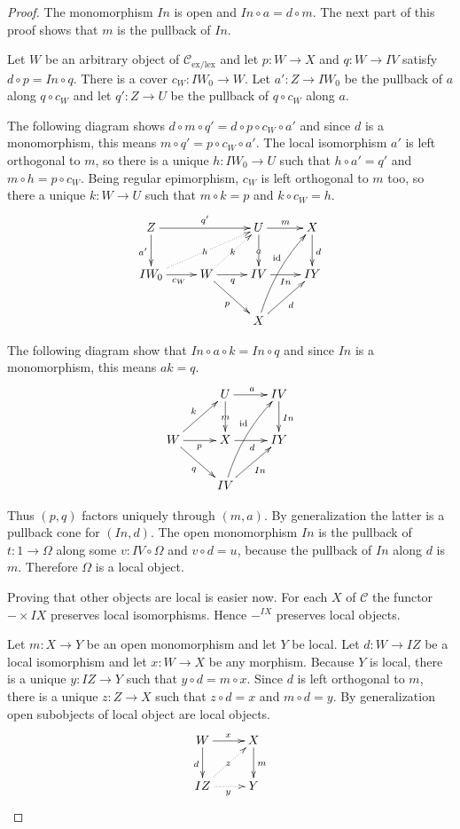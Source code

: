 \documentclass[sort&compress]{elsarticle}
\theoremstyle{plain}
\theoremstyle{definition}
\theoremstyle{remark}
\newcommand\cat\mathcal
\newcommand\exlex{_\mathrm{ex/lex}}\newcommand\exreg{_\mathrm{ex/reg}}
\begin{document}
\begin{proof}
The monomorphism $In$ is open and $In \circ a = d\circ m$. The next part of this proof shows that $m$ is the pullback of $In$.

Let $W$ be an arbitrary object of $\cat C\exlex$ and let $p: W\to X$ and $q:W\to IV$ satisfy $d\circ p = In\circ q$. There is a cover $c_W:IW_0 \to W$. Let $a':Z\to IW_0$ be the pullback of $a$ along $q\circ c_W$ and let $q':Z\to U$ be the pullback of $q\circ c_W$ along $a$.

The following diagram shows $d\circ m \circ q' = d\circ p \circ c_W \circ a'$ and since $d$ is a monomorphism, this means $m\circ q' = p \circ c_W \circ a'$. The local isomorphism $a'$ is left orthogonal to $m$, so there is a unique $h:IW_0 \to U$ such that $h\circ a'= q'$ and $m\circ h = p\circ c_W$. Being regular epimorphism, $c_W$ is left orthogonal to $m$ too, so there a unique $k: W\to U$ such that $m\circ k = p$ and $k\circ c_W = h$.
\[ \xymatrix{
Z \ar[rr]^{q'} \ar[d]_{a'} && U \ar[r]^m \ar[d]|a & X\ar[d]^d \\
IW_0 \ar[r]_{c_W}\ar@{.>}[urr]|h & W \ar[r]_q \ar[dr]_{p}\ar@{.>}[ur]|k & IV\ar[r]_{In} & IY \\ 
& & X \ar[ur]_d \ar@/^/[uur]^(.6)\id
}\]

The following diagram show that $In\circ a\circ k = In\circ q$ and since $In$ is a monomorphism, this means $a k = q$.
\[ \xymatrix{
& U \ar[d]|m \ar[r]^a & IV \ar[d]^{In} \\  
W \ar[ur]^k \ar[r]_p \ar[dr]_q & X\ar[r]_d & IY \\
& IV \ar[ur]_{In} \ar@/^/[uur]^(.6)\id
}\]

Thus $(p,q)$ factors uniquely through $(m,a)$. By generalization the latter is a pullback cone for $(In, d)$. The open monomorphism $In$ is the pullback of $t:1\to \Omega$ along some $v:IV\circ \Omega$ and $v\circ d = u$, because the pullback of $In$ along $d$ is $m$. Therefore $\Omega$ is a local object.

Proving that other objects are local is easier now. For each $X$ of $\cat C$ the functor $-\times IX$ preserves local isomorphisms. Hence $-^{IX}$ preserves local objects.

Let $m:X\to Y$ be an open monomorphism and let $Y$ be local. Let $d: W\to IZ$ be a local isomorphism and let $x:W\to X$ be any morphism. Because $Y$ is local, there is a unique $y: IZ\to Y$ such that $y\circ d = m\circ x$. Since $d$ is left orthogonal to $m$, there is a unique $z:Z\to X$ such that $z\circ d = x$ and $m\circ d = y$. By generalization open subobjects of local object are local objects.
\[ \xymatrix{
W\ar[d]_d \ar[r]^x & X\ar[d]^m \\
IZ \ar@{.>}[r]_{y} \ar@{.>}[ur]|z & Y
}\]


\end{proof}
\end{document}
